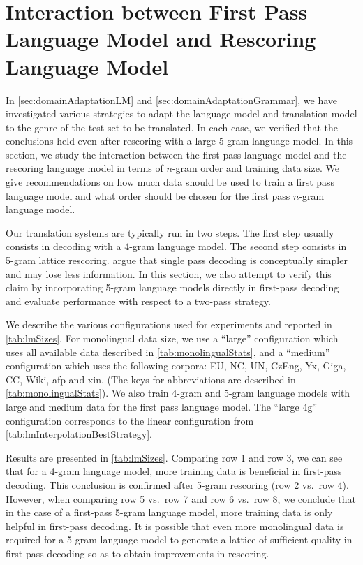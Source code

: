 
\section{Interaction between First Pass Language Model and Rescoring Language Model}
\label{sec:bestPossibleRescoring}

In \autoref{sec:domainAdaptationLM} and \autoref{sec:domainAdaptationGrammar},
we have investigated various strategies to adapt the language model
and translation model to the genre of the test set to be translated.
In each case, we verified that the conclusions held even after
rescoring with a large 5-gram language model.
In this section, we study the interaction between the first pass language model
and the rescoring language model in terms of $n$-gram order and training
data size. We give recommendations on how much
data should be used to train a first pass language model
and what order should be chosen for the first pass
$n$-gram language model.

Our translation systems are typically run in two steps. The
first step usually consists in decoding with
a 4-gram language model. The second step consists
in 5-gram lattice rescoring.
\citet{brants-popat-xu-och-dean:2007:EMNLP-CoNLL} argue
that single pass decoding is conceptually simpler
and may lose less information.
In this section, we also attempt to verify this claim
by incorporating 5-gram language models directly in
first-pass decoding and evaluate performance with respect
to a two-pass strategy.

We describe the various configurations used for experiments and
reported in \autoref{tab:lmSizes}. For monolingual data size,
we use a ``large'' configuration which uses all available
data described in \autoref{tab:monolingualStats}, and a
``medium'' configuration which uses the following corpora: EU, NC, UN, CzEng, Yx, Giga, CC, Wiki, afp and xin.
(The keys for abbreviations are described in \autoref{tab:monolingualStats}).
We also train 4-gram and 5-gram language models with large and
medium data for the first pass language model.
The ``large 4g'' configuration corresponds to the linear
configuration from \autoref{tab:lmInterpolationBestStrategy}.

Results are presented in \autoref{tab:lmSizes}.
Comparing row 1 and row 3, we can see that for a 4-gram
language model, more training data is beneficial in first-pass decoding.
This conclusion is confirmed after 5-gram rescoring (row 2 vs.\ row 4).
However, when comparing row 5 vs.\ row 7 and row 6 vs.\ row 8, we conclude that
in the case of a first-pass 5-gram language model, more training
data is only helpful in first-pass decoding.
It is possible that even more monolingual data is required for a 5-gram
language model to generate a lattice of sufficient quality in first-pass
decoding so as to obtain improvements in rescoring.

